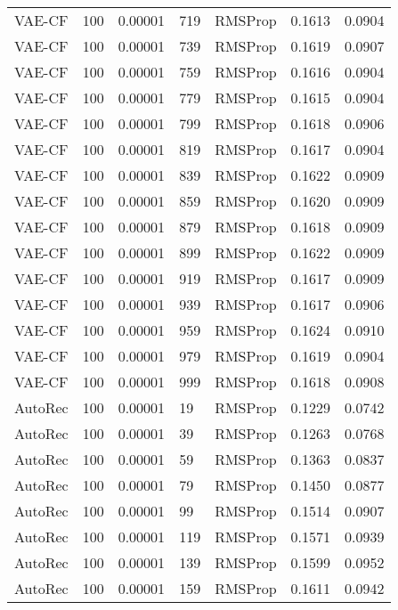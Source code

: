 \begin{tabular}{llrllrr}
  VAE-CF &  100 &  0.00001 &   719 &   RMSProp &  0.1613 &       0.0904 \\
  VAE-CF &  100 &  0.00001 &   739 &   RMSProp &  0.1619 &       0.0907 \\
  VAE-CF &  100 &  0.00001 &   759 &   RMSProp &  0.1616 &       0.0904 \\
  VAE-CF &  100 &  0.00001 &   779 &   RMSProp &  0.1615 &       0.0904 \\
  VAE-CF &  100 &  0.00001 &   799 &   RMSProp &  0.1618 &       0.0906 \\
  VAE-CF &  100 &  0.00001 &   819 &   RMSProp &  0.1617 &       0.0904 \\
  VAE-CF &  100 &  0.00001 &   839 &   RMSProp &  0.1622 &       0.0909 \\
  VAE-CF &  100 &  0.00001 &   859 &   RMSProp &  0.1620 &       0.0909 \\
  VAE-CF &  100 &  0.00001 &   879 &   RMSProp &  0.1618 &       0.0909 \\
  VAE-CF &  100 &  0.00001 &   899 &   RMSProp &  0.1622 &       0.0909 \\
  VAE-CF &  100 &  0.00001 &   919 &   RMSProp &  0.1617 &       0.0909 \\
  VAE-CF &  100 &  0.00001 &   939 &   RMSProp &  0.1617 &       0.0906 \\
  VAE-CF &  100 &  0.00001 &   959 &   RMSProp &  0.1624 &       0.0910 \\
  VAE-CF &  100 &  0.00001 &   979 &   RMSProp &  0.1619 &       0.0904 \\
  VAE-CF &  100 &  0.00001 &   999 &   RMSProp &  0.1618 &       0.0908 \\
 AutoRec &  100 &  0.00001 &    19 &   RMSProp &  0.1229 &       0.0742 \\
 AutoRec &  100 &  0.00001 &    39 &   RMSProp &  0.1263 &       0.0768 \\
 AutoRec &  100 &  0.00001 &    59 &   RMSProp &  0.1363 &       0.0837 \\
 AutoRec &  100 &  0.00001 &    79 &   RMSProp &  0.1450 &       0.0877 \\
 AutoRec &  100 &  0.00001 &    99 &   RMSProp &  0.1514 &       0.0907 \\
 AutoRec &  100 &  0.00001 &   119 &   RMSProp &  0.1571 &       0.0939 \\
 AutoRec &  100 &  0.00001 &   139 &   RMSProp &  0.1599 &       0.0952 \\
 AutoRec &  100 &  0.00001 &   159 &   RMSProp &  0.1611 &       0.0942 \\

\end{tabular}
